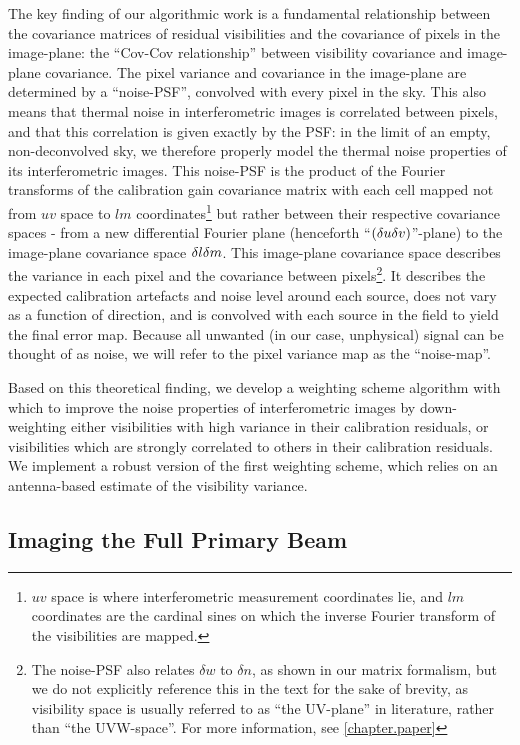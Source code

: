 \pg
The key finding of our algorithmic work is a fundamental relationship between the covariance matrices of residual visibilities and the covariance of pixels in the image-plane: the ``Cov-Cov relationship'' between visibility covariance and image-plane covariance. The pixel variance and covariance in the image-plane are determined by a ``noise-PSF'', convolved with every pixel in the sky. This also means that thermal noise in interferometric images is correlated between pixels, and that this correlation is given exactly by the PSF: in the limit of an empty, non-deconvolved sky, we therefore properly model the thermal noise properties of its interferometric images. This noise-PSF is the product of the Fourier transforms of the calibration gain covariance matrix with each cell mapped not from $uv$ space to $lm$ coordinates\footnote{$uv$ space is where interferometric measurement coordinates lie, and $lm$ coordinates are the cardinal sines on which the inverse Fourier transform of the visibilities are mapped.} but rather between their respective covariance spaces - from a new {differential Fourier plane (henceforth ``$\left(\delta u\delta v\right)$''-plane) to the image-plane covariance space $\delta l\delta m$. This image-plane covariance space describes} the variance in each pixel and the covariance between pixels\footnote{{The noise-PSF also relates $\delta w$ to $\delta n$, as shown in our matrix formalism, but we do not explicitly reference this in the text for the sake of brevity, as visibility space is usually referred to as ``the UV-plane'' in literature, rather than ``the UVW-space''. For more information, see \cref{chapter.paper}}}. It describes the expected calibration artefacts and noise level around each source, does not vary as a function of direction, and is convolved with each source in the field to yield the final error map. Because all unwanted (in our case, unphysical) signal can be thought of as noise, we will refer to {the pixel variance map} as the ``noise-map''.

\pg
Based on this theoretical finding, we develop a weighting scheme algorithm with which to improve the noise properties of interferometric images by down-weighting either visibilities with high variance in their calibration residuals, or visibilities which are strongly correlated to others in their calibration residuals. We implement a robust version of the first weighting scheme, which relies on an antenna-based estimate of the visibility variance. 


\subsection{Imaging the Full Primary Beam}


